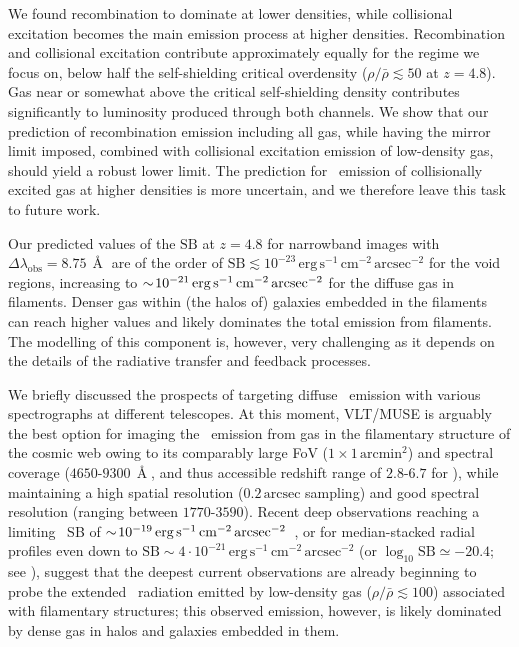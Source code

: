 We found recombination to dominate at lower densities, while collisional excitation becomes the main emission process at higher densities. Recombination and collisional excitation contribute approximately equally for the regime we focus on, below half the self-shielding critical overdensity ($\rho/\bar{\rho} \lesssim 50$ at $z=4.8$). Gas near or somewhat above the critical self-shielding density contributes significantly to luminosity produced through both channels. We show that our prediction of recombination emission including all gas, while having the mirror limit imposed, combined with collisional excitation emission of low-density gas, should yield a robust lower limit. The prediction for \lya\ emission of collisionally excited gas at higher densities is more uncertain, and we therefore leave this task to future work.

Our predicted values of the $\text{SB}$ at $z=4.8$ for narrowband images with $\Delta \lambda_\text{obs} = 8.75 \, \Angstrom$ are of the order of $\text{SB} \lesssim 10^{-23} \, \mathrm{erg \, s^{-1} \, cm^{-2} \, arcsec^{-2}}$ for the void regions, increasing to $\sim \! 10^{-21} \, \mathrm{erg \, s^{-1} \, cm^{-2} \, arcsec^{-2}}$ for the diffuse gas in filaments. Denser gas within (the halos of) galaxies embedded in the filaments can reach higher values and likely dominates the total emission from filaments. The modelling of this component is, however, very challenging as it depends on the details of the radiative transfer and feedback processes.

We briefly discussed the prospects of targeting diffuse \lya\ emission with various spectrographs at different telescopes. At this moment, VLT/MUSE is arguably the best option for imaging the \lya\ emission from gas in the filamentary structure of the cosmic web owing to its comparably large FoV ($1 \times 1 \, \mathrm{arcmin}^2$) and spectral coverage ($4650$-$9300 \, \Angstrom$, and thus accessible redshift range of $2.8$-$6.7$ for \lya), while maintaining a high spatial resolution ($0.2 \, \mathrm{arcsec}$ sampling) and good spectral resolution (ranging between $1770$-$3590$). Recent deep observations reaching a limiting \lya\ SB of $\sim \! 10^{-19} \, \mathrm{erg \, s^{-1} \, cm^{-2} \, arcsec^{-2}}$~\cite[e.g.][]{2015A&A...575A..75B, 2017A&A...608A...1B, 2021A&A...647A.107B}, or for median-stacked radial profiles even down to $\text{SB} \sim 4 \cdot 10^{-21} \, \mathrm{erg \, s^{-1} \, cm^{-2} \, arcsec^{-2}}$ (or $\log_{10}{\text{SB}} \simeq -20.4$; see \citealt{2018Natur.562..229W}), suggest that the deepest current observations are already beginning to probe the extended \lya\ radiation emitted by low-density gas ($\rho/\bar{\rho} \lesssim 100$) associated with filamentary structures; this observed emission, however, is likely dominated by dense gas in halos and galaxies embedded in them.

